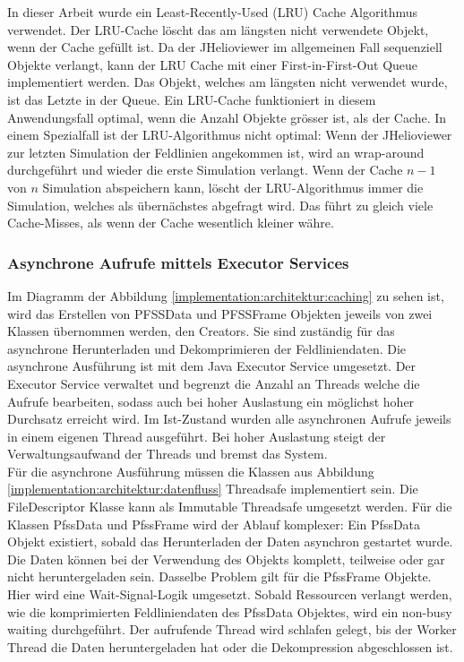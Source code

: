 In dieser Arbeit wurde ein Least-Recently-Used (LRU) Cache Algorithmus verwendet. Der LRU-Cache löscht das am längsten nicht verwendete Objekt, wenn der Cache gefüllt ist. Da der JHelioviewer im allgemeinen Fall sequenziell Objekte verlangt, kann der LRU Cache mit einer First-in-First-Out Queue implementiert werden. Das Objekt, welches am längsten nicht  verwendet wurde, ist das Letzte in der Queue. Ein LRU-Cache funktioniert in diesem Anwendungsfall optimal, wenn die Anzahl Objekte grösser ist, als der Cache. In einem Spezialfall ist der LRU-Algorithmus nicht optimal: Wenn der JHelioviewer zur letzten Simulation der Feldlinien angekommen ist, wird an wrap-around durchgeführt und wieder die erste Simulation verlangt. Wenn der Cache $n-1$ von $n$ Simulation abspeichern kann, löscht der LRU-Algorithmus immer die Simulation, welches als übernächstes abgefragt wird. Das führt zu gleich viele Cache-Misses, als wenn der Cache wesentlich kleiner währe.

\subsubsection{Asynchrone Aufrufe mittels Executor Services}
Im Diagramm der Abbildung \ref{implementation:architektur:caching} zu sehen ist, wird das Erstellen von PFSSData und PFSSFrame Objekten jeweils von zwei Klassen übernommen werden, den Creators. Sie sind zuständig für das asynchrone Herunterladen und Dekomprimieren der Feldliniendaten. Die asynchrone Ausführung ist mit dem Java Executor Service umgesetzt. Der Executor Service verwaltet und begrenzt die Anzahl an Threads welche die Aufrufe bearbeiten, sodass auch bei hoher Auslastung ein möglichst hoher Durchsatz erreicht wird. Im Ist-Zustand wurden alle asynchronen Aufrufe jeweils in einem eigenen Thread ausgeführt. Bei hoher Auslastung steigt der Verwaltungsaufwand der Threads und bremst das System.\\
Für die asynchrone Ausführung müssen die Klassen aus Abbildung \ref{implementation:architektur:datenfluss} Threadsafe implementiert sein. Die FileDescriptor Klasse kann als Immutable Threadsafe umgesetzt werden. Für die Klassen PfssData und PfssFrame wird der Ablauf komplexer: Ein PfssData Objekt existiert, sobald das Herunterladen der Daten asynchron gestartet wurde. Die Daten können bei der Verwendung des Objekts komplett, teilweise oder gar nicht heruntergeladen sein. Dasselbe Problem gilt für die PfssFrame Objekte. Hier wird eine Wait-Signal-Logik umgesetzt. Sobald Ressourcen verlangt werden, wie die komprimierten Feldliniendaten des PfssData Objektes, wird ein non-busy waiting durchgeführt. Der aufrufende Thread wird schlafen gelegt, bis der Worker Thread die Daten heruntergeladen hat oder die Dekompression abgeschlossen ist.
